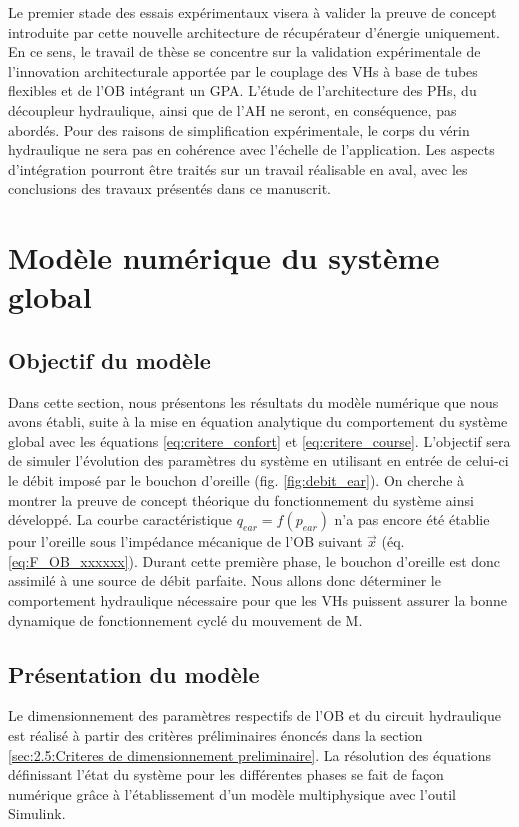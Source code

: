 Le premier stade des essais expérimentaux visera à valider la preuve de concept introduite par cette nouvelle architecture de récupérateur d'énergie uniquement. En ce sens, le travail de thèse se concentre sur la validation expérimentale de l'innovation architecturale apportée par le couplage des VHs à base de tubes flexibles et de l'OB intégrant un GPA. L'étude de l'architecture des PHs, du découpleur hydraulique, ainsi que de l'AH ne seront, en conséquence, pas abordés. Pour des raisons de simplification expérimentale, le corps du vérin hydraulique ne sera pas en cohérence avec l'échelle de l'application. Les aspects d'intégration pourront être traités sur un travail réalisable en aval, avec les conclusions des travaux présentés dans ce manuscrit.
\section{Modèle numérique du système global}
\label{subsec:2.6_Modele numerique du systeme global}
		\subsection{Objectif du modèle}
		\label{2.6.1_Objectif du modele}
Dans cette section, nous présentons les résultats du modèle numérique que nous avons établi, suite à la mise en équation analytique du comportement du système global avec les équations \ref{eq:critere_confort} et \ref{eq:critere_course}. L'objectif sera de simuler l'évolution des paramètres du système en utilisant en entrée de celui-ci le débit imposé par le bouchon d'oreille (fig. \ref{fig:debit_ear}). On cherche à montrer la preuve de concept théorique du fonctionnement du système ainsi développé. La courbe caractéristique $q_{ear}=f(p_{ear})$ n'a pas encore été établie pour l'oreille sous l'impédance mécanique de l'OB suivant $\vec{x}$ (éq. \ref{eq:F_OB_xxxxxx}). Durant cette première phase, le bouchon d'oreille est donc assimilé à une source de débit parfaite. Nous allons donc déterminer le comportement hydraulique nécessaire pour que les VHs puissent assurer la bonne dynamique de fonctionnement cyclé du mouvement de M.
		\subsection{Présentation du modèle}
		\label{2.6.2_Presentation du modele}
Le dimensionnement des paramètres respectifs de l'OB et du circuit hydraulique est réalisé à partir des critères préliminaires énoncés dans la section \ref{sec:2.5:Criteres de dimensionnement preliminaire}. La résolution des équations définissant l'état du système pour les différentes phases se fait de façon numérique grâce à l’établissement d'un modèle multiphysique avec l'outil Simulink.

